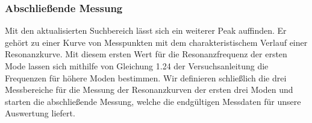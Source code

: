 \subsubsection*{Abschließende Messung}

Mit den aktualisierten Suchbereich lässt sich ein weiterer Peak auffinden.
Er gehört zu einer Kurve von Messpunkten mit dem charakteristischem Verlauf einer Resonanzkurve.
Mit diesem ersten Wert für die Resonanzfrequenz der ersten Mode lassen sich mithilfe von Gleichung 1.24 der Versuchsanleitung \cite{Anleitung} die Frequenzen für höhere Moden bestimmen.
Wir definieren schließlich die drei Messbereiche für die Messung der Resonanzkurven der ersten drei Moden und starten die abschließende Messung, welche die endgültigen Messdaten für unsere Auswertung liefert.

